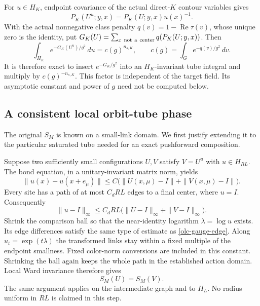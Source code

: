 For $u\in H_K$, endpoint covariance of the actual direct-$K$
contour variables gives
\[
 P_K(U^u;y,x)=P_K(U;y,x)u(x)^{-1}.
\]
With the actual nonnegative class penalty
$q(v)=1-\operatorname{Re}\tau(v)$, whose unique zero is the
identity, put $G_K(U)=\sum_{x\ {\rm not\ a\ center}}q(P_K(U;y,x))$.
Then
\begin{equation}
 \int_{H_K}e^{-G_K(U^u)/g^2}\,du
       =c(g)^{n_{s,K}},\qquad
 c(g)=\int_G e^{-q(v)/g^2}\,dv .
 \label{olc-gauge-insertion}
\end{equation}
It is therefore exact to insert $e^{-G_K/g^2}$ into an
$H_K$-invariant tube integral and multiply by
$c(g)^{-n_{s,K}}$. This factor is independent of the target
field. Its asymptotic constant and power of $g$ need not be
computed below.

\subsection{A consistent local orbit-tube phase}
\label{olc-tube-section}

The original $S_M$ is known on a small-link domain. We first
justify extending it to the particular saturated tube needed
for an exact pushforward composition.

Suppose two sufficiently small configurations $U,V$ satisfy
$V=U^u$ with $u\in H_{RL}$. The bond equation, in a
unitary-invariant matrix norm, yields
\begin{equation}
 \|u(x)-u(x+e_\mu)\|
   \leq C\bigl(\|U(x,\mu)-I\|+\|V(x,\mu)-I\|\bigr).
 \label{olc-gauge-edge}
\end{equation}
Every site has a path of at most $C_dRL$ edges to a final
center, where $u=I$. Consequently
\begin{equation}
 \|u-I\|_\infty
   \leq C_dRL\bigl(\|U-I\|_\infty+\|V-I\|_\infty\bigr).
 \label{olc-gauge-small}
\end{equation}
Shrink the comparison ball so that the near-identity logarithm
$\lambda=\log u$ exists. Its edge differences satisfy the
same type of estimate as \eqref{olc-gauge-edge}.
Along $u_t=\exp(t\lambda)$ the transformed links stay within
a fixed multiple of the endpoint smallness. Fixed color-norm
conversions are included in this constant. Shrinking the ball
again keeps the whole path in the established action domain.
Local Ward invariance therefore gives
\begin{equation}
                         S_M(U)=S_M(V).
 \label{olc-phase-consistency}
\end{equation}
The same argument applies on the intermediate graph and to
$H_L$. No radius uniform in $RL$ is claimed in this step.

